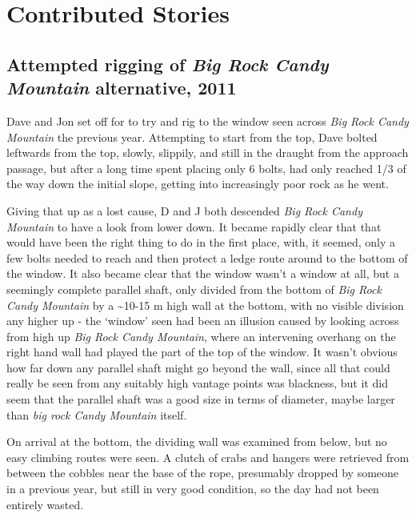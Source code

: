 \hypertarget{contributed-stories}{%
\section{Contributed Stories}\label{contributed-stories}}

\hypertarget{attempted-rigging-of-big-rock-candy-mountain-alternative-2011}{%
\subsection{\texorpdfstring{Attempted rigging of \emph{Big Rock Candy
Mountain} alternative,
2011}{Attempted rigging of Big Rock Candy Mountain alternative, 2011}}\label{attempted-rigging-of-big-rock-candy-mountain-alternative-2011}}

Dave and Jon set off for to try and rig to the window seen across
\emph{Big Rock Candy Mountain} the previous year. Attempting to start
from the top, Dave bolted leftwards from the top, slowly, slippily, and
still in the draught from the approach passage, but after a long time
spent placing only 6 bolts, had only reached 1/3 of the way down the
initial slope, getting into increasingly poor rock as he went.

Giving that up as a lost cause, D and J both descended \emph{Big Rock
Candy Mountain} to have a look from lower down. It became rapidly clear
that that would have been the right thing to do in the first place,
with, it seemed, only a few bolts needed to reach and then protect a
ledge route around to the bottom of the window. It also became clear
that the window wasn't a window at all, but a seemingly complete
parallel shaft, only divided from the bottom of \emph{Big Rock Candy
Mountain} by a \textasciitilde 10-15 m high wall at the bottom, with no
visible division any higher up - the `window' seen had been an illusion
caused by looking across from high up \emph{Big Rock Candy Mountain},
where an intervening overhang on the right hand wall had played the part
of the top of the window. It wasn't obvious how far down any parallel
shaft might go beyond the wall, since all that could really be seen from
any suitably high vantage points was blackness, but it did seem that the
parallel shaft was a good size in terms of diameter, maybe larger than
\emph{big rock Candy Mountain} itself.

On arrival at the bottom, the dividing wall was examined from below, but
no easy climbing routes were seen. A clutch of crabs and hangers were
retrieved from between the cobbles near the base of the rope, presumably
dropped by someone in a previous year, but still in very good condition,
so the day had not been entirely wasted.

